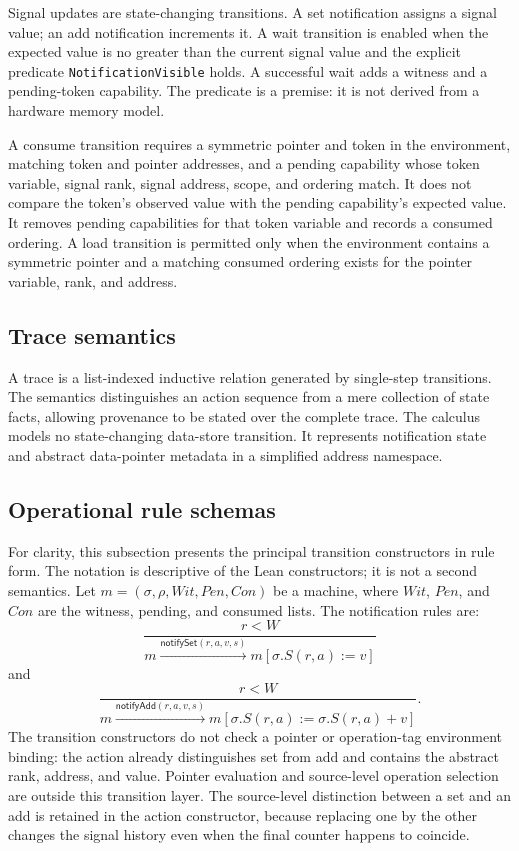 \documentclass[a4paper,USenglish]{lipics-v2021}
\begin{document}
Signal updates are state-changing transitions. A set notification assigns a signal value; an add notification increments it. A wait transition is enabled when the expected value is no greater than the current signal value and the explicit predicate \texttt{NotificationVisible} holds. A successful wait adds a witness and a pending-token capability. The predicate is a premise: it is not derived from a hardware memory model.

A consume transition requires a symmetric pointer and token in the environment, matching token and pointer addresses, and a pending capability whose token variable, signal rank, signal address, scope, and ordering match. It does not compare the token's observed value with the pending capability's expected value. It removes pending capabilities for that token variable and records a consumed ordering. A load transition is permitted only when the environment contains a symmetric pointer and a matching consumed ordering exists for the pointer variable, rank, and address.

\subsection{Trace semantics}
A trace is a list-indexed inductive relation generated by single-step transitions. The semantics distinguishes an action sequence from a mere collection of state facts, allowing provenance to be stated over the complete trace. The calculus models no state-changing data-store transition. It represents notification state and abstract data-pointer metadata in a simplified address namespace.

\subsection{Operational rule schemas}
For clarity, this subsection presents the principal transition constructors in
rule form. The notation is descriptive of the Lean constructors; it is not a
second semantics. Let \(m=(\sigma,\rho,Wit,Pen,Con)\) be a machine, where
\(Wit\), \(Pen\), and \(Con\) are the witness, pending, and consumed lists.
The notification rules are:
\[
\frac{r<W}
     {m\xrightarrow{\mathsf{notifySet}(r,a,v,s)}
  m[\sigma.S(r,a):=v]}
\]
and
\[
\frac{r<W}
     {m\xrightarrow{\mathsf{notifyAdd}(r,a,v,s)}
  m[\sigma.S(r,a):=\sigma.S(r,a)+v]}.
\]
The transition constructors do not check a pointer or operation-tag
environment binding: the action already distinguishes set from add and
contains the abstract rank, address, and value. Pointer evaluation and
source-level operation selection are outside this transition layer.
The source-level distinction between a set and an add is retained in the
action constructor, because replacing one by the other changes the signal
history even when the final counter happens to coincide.
\end{document}
